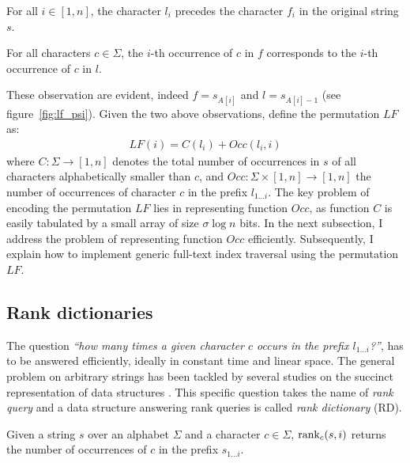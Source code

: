 \begin{observation}
\label{obs:lf-a}
\citep{Burrows1994}
For all $i \in [1,n]$, the character $l_i$ precedes the character $f_i$ in the original string $s$.%
\end{observation}
\begin{observation}
\label{obs:lf-b}
\citep{Burrows1994}
For all characters $c \in \Sigma$, the $i$-th occurrence of $c$ in $f$ corresponds to the $i$-th occurrence of $c$ in $l$.
\end{observation}

These observation are evident, indeed $f = s_{A[i]}$ and $l = s_{A[i] - 1}$ (see figure~\ref{fig:lf_psi}).
Given the two above observations, \cite{Ferragina2000} define the permutation $LF$ as:
\begin{eqnarray}
LF(i) = C(l_i) + Occ(l_i, i)
\end{eqnarray}
where $C : \Sigma \rightarrow [1,n]$ denotes the total number of occurrences in $s$ of all characters alphabetically smaller than $c$, and $Occ :  \Sigma \times [1,n] \rightarrow [1,n]$ the number of occurrences of character $c$ in the prefix $l_{1 \dots i}$.
The key problem of encoding the permutation $LF$ lies in representing function $Occ$, as function $C$ is easily tabulated by a small array of size $\sigma \log{n}$ bits.
In the next subsection, I address the problem of representing function $Occ$ efficiently. Subsequently, I explain how to implement generic full-text index traversal using the permutation $LF$.

\subsection{Rank dictionaries}
\label{sec:index:succinct:rd}

The question \emph{``how many times a given character $c$ occurs in the prefix $l_{1 \dots i}$?''}, has to be answered efficiently, ideally in constant time and linear space.
The general problem on arbitrary strings has been tackled by several studies on the succinct representation of data structures \citep{Jacobson1989}.
This specific question takes the name of \emph{rank query} and a data structure answering rank queries is called \emph{rank dictionary} (RD).

\begin{definition}
Given a string $s$ over an alphabet $\Sigma$ and a character $c \in \Sigma$, $\text{rank}_c(s, i)$ returns the number of occurrences of $c$ in the prefix $s_{1 \dots i}$.
\end{definition}

